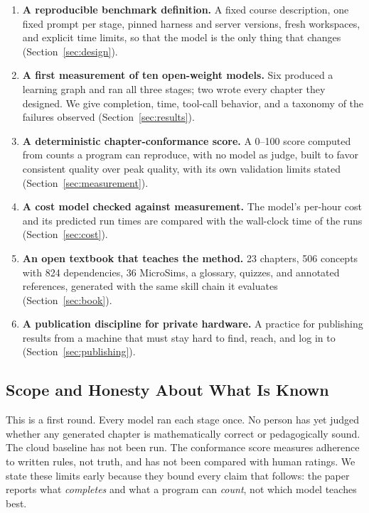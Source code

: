\documentclass[11pt]{article}
\begin{document}
\begin{enumerate}
\item \textbf{A reproducible benchmark definition.} A fixed course description, one fixed prompt per stage, pinned harness and server versions, fresh workspaces, and explicit time limits, so that the model is the only thing that changes (Section~\ref{sec:design}).

\item \textbf{A first measurement of ten open-weight models.} Six produced a learning graph and ran all three stages; two wrote every chapter they designed. We give completion, time, tool-call behavior, and a taxonomy of the failures observed (Section~\ref{sec:results}).

\item \textbf{A deterministic chapter-conformance score.} A 0--100 score computed from counts a program can reproduce, with no model as judge, built to favor consistent quality over peak quality, with its own validation limits stated (Section~\ref{sec:measurement}).

\item \textbf{A cost model checked against measurement.} The model's per-hour cost and its predicted run times are compared with the wall-clock time of the runs (Section~\ref{sec:cost}).

\item \textbf{An open textbook that teaches the method.} 23 chapters, 506 concepts with 824 dependencies, 36 MicroSims, a glossary, quizzes, and annotated references, generated with the same skill chain it evaluates (Section~\ref{sec:book}).

\item \textbf{A publication discipline for private hardware.} A practice for publishing results from a machine that must stay hard to find, reach, and log in to (Section~\ref{sec:publishing}).
\end{enumerate}

\subsection{Scope and Honesty About What Is Known}

This is a first round. Every model ran each stage once. No person has yet judged whether any generated chapter is mathematically correct or pedagogically sound. The cloud baseline has not been run. The conformance score measures adherence to written rules, not truth, and has not been compared with human ratings. We state these limits early because they bound every claim that follows: the paper reports what \textit{completes} and what a program can \textit{count}, not which model teaches best.
\end{document}
